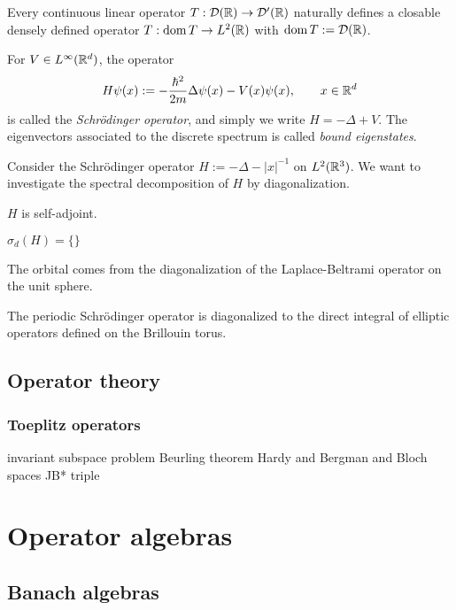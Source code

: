 \documentclass{../../large}
\begin{document}
\begin{prb}
\begin{parts}
\item Every continuous linear operator $T:\mathcal{D}(\mathbb{R})\to\mathcal{D}'(\mathbb{R})$ naturally defines a closable densely defined operator $T:\operatorname{dom} T\to L^2(\mathbb{R})$ with $\operatorname{dom} T:=\mathcal{D}(\mathbb{R})$.
\end{parts}
\end{prb}

\begin{prb}
For $V\in L^\infty(\mathbb{R}^d)$, the operator
\[H\psi(x):=-\frac{\hbar^2}{2m}\Delta\psi(x)-V(x)\psi(x),\qquad x\in\mathbb{R}^d\]
is called the \emph{Schr\"odinger operator}, and simply we write $H=-\Delta+V$.
The eigenvectors associated to the discrete spectrum is called \emph{bound eigenstates}.

Consider the Schr\"odinger operator $H:=-\Delta-|x|^{-1}$ on $L^2(\mathbb{R}^3)$.
We want to investigate the spectral decomposition of $H$ by diagonalization.
\begin{parts}
\item $H$ is self-adjoint.
\item $\sigma_d(H)=\{\}$
\end{parts}
\end{prb}

The orbital comes from the diagonalization of the Laplace-Beltrami operator on the unit sphere.

The periodic Schr\"odinger operator is diagonalized to the direct integral of elliptic operators defined on the Brillouin torus.



\chapter{Operator theory}
\section{Toeplitz operators}

invariant subspace problem
Beurling theorem
Hardy and Bergman and Bloch spaces
JB* triple





\part{Operator algebras}
\chapter{Banach algebras}
\end{document}
